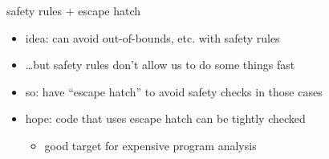 \begin{frame}{safety rules + escape hatch}
    \begin{itemize}
    \item idea: can avoid out-of-bounds, etc. with safety rules
    \item \ldots but safety rules don't allow us to do some things fast
    \vspace{.5cm}
    \item so: have ``escape hatch'' to avoid safety checks in those cases
    \item hope: code that uses escape hatch can be tightly checked
        \begin{itemize}
        \item good target for expensive program analysis
        \end{itemize}
    \end{itemize}
\end{frame}
